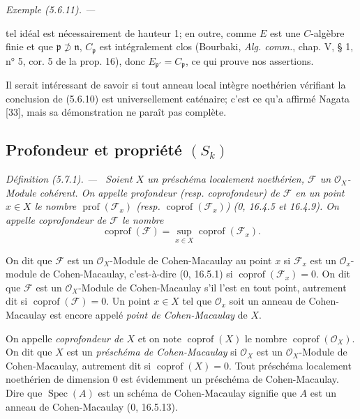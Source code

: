 \documentclass[10pt,oneside]{book}
\newcommand{\oldpage}[2][]{%
  \setcounter{footnote}{0}%
  \marginpar{\scriptsize\textbf{#1}~|~#2}\ignorespaces}
\newenvironment{definition}[1][]{%
  \par\medskip\noindent\itshape Définition (#1). ---\ }{\par}
\newenvironment{example}[1][]{%
  \par\medskip\noindent\textit{Exemple (#1). ---\ }}{\par}
\begin{document}
\begin{example}[5.6.11]
\oldpage[IV-2]{103}

tel idéal est nécessairement de hauteur 1; en outre, comme $E$ est une
$C$-algèbre finie et que $\mathfrak p\not\supset\mathfrak n$,
$C_{\mathfrak p}$ est intégralement clos (Bourbaki, \emph{Alg. comm.},
chap. V, § 1, n° 5, cor. 5 de la prop. 16), donc
$E_{\mathfrak p'}=C_{\mathfrak p}$, ce qui prouve nos assertions.

Il serait intéressant de savoir si tout anneau local intègre noethérien
vérifiant la conclusion de (5.6.10) est universellement caténaire; c'est ce
qu'a affirmé Nagata [33], mais sa démonstration ne paraît pas complète.
\end{example}

\subsection{\texorpdfstring{Profondeur et propriété $(S_k)$}{Profondeur et propriété (S\string_k)}}

\begin{definition}[5.7.1]
\label{IV.2.s5.7.1-fr}
Soient $X$ un préschéma localement noethérien, $\mathscr F$ un
$\mathcal O_X$-Module cohérent. On appelle \emph{profondeur} (resp.
\emph{coprofondeur}) de $\mathscr F$ en un point $x\in X$ le nombre
$\operatorname{prof}(\mathscr F_x)$ (resp.
$\operatorname{coprof}(\mathscr F_x)$) (0, 16.4.5 et 16.4.9). On appelle
\emph{coprofondeur de $\mathscr F$} le nombre
\begin{equation}
\operatorname{coprof}(\mathscr F)
=\sup_{x\in X}\operatorname{coprof}(\mathscr F_x).
\tag{5.7.1.1}\label{IV.2.s5.7.1.1-fr}
\end{equation}

On dit que $\mathscr F$ est un $\mathcal O_X$-Module de Cohen-Macaulay au
point $x$ si $\mathscr F_x$ est un $\mathcal O_x$-module de Cohen-Macaulay,
c'est-à-dire (0, 16.5.1) si $\operatorname{coprof}(\mathscr F_x)=0$. On dit
que $\mathscr F$ est un $\mathcal O_X$-Module de Cohen-Macaulay s'il l'est
en tout point, autrement dit si $\operatorname{coprof}(\mathscr F)=0$. Un
point $x\in X$ tel que $\mathcal O_x$ soit un anneau de Cohen-Macaulay est
encore appelé \emph{point de Cohen-Macaulay} de $X$.

On appelle \emph{coprofondeur de $X$} et on note $\operatorname{coprof}(X)$
le nombre $\operatorname{coprof}(\mathcal O_X)$. On dit que $X$ est un
\emph{préschéma de Cohen-Macaulay} si $\mathcal O_X$ est un
$\mathcal O_X$-Module de Cohen-Macaulay, autrement dit si
$\operatorname{coprof}(X)=0$. Tout préschéma localement noethérien de
dimension 0 est évidemment un préschéma de Cohen-Macaulay. Dire que
$\operatorname{Spec}(A)$ est un schéma de Cohen-Macaulay signifie que $A$
est un anneau de Cohen-Macaulay (0, 16.5.13).
\end{definition}
\end{document}
